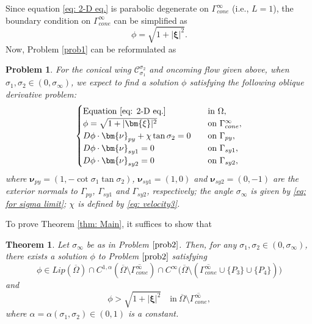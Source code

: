 \documentclass[reqno,12pt]{amsart}
\newtheorem{theorem}{Theorem}[section]
\newtheorem{problem}{Problem}[section]
\numberwithin{equation}{section}
\begin{document}
Since equation \eqref{eq: 2-D eq.} is parabolic degenerate on $\Gamma_{cone}^{\infty}$ (i.e., $L=1$), the boundary condition on $\Gamma_{cone}^{\infty}$ can be simplified as
\begin{equation}\label{eq:3.1}
	\phi=\sqrt{1+|\bm{\xi}|^{2}}.
\end{equation}
Now, Problem \ref{prob1} can be reformulated as

\begin{problem}\label{prob2}
    For the conical wing $\mathcal{C}_{\sigma_1}^{\sigma_2}$ and oncoming flow given above, when $\sigma_{1},\sigma_{2}\in(0,\sigma_{\infty})$, we expect to find a solution $\phi$ satisfying the following oblique derivative problem:
	\begin{equation}\label{eq: problem for phi}
		\begin{cases}
			\text{Equation}~\eqref{eq: 2-D eq.}\quad&\text{in $\Omega$},\\
			\phi=\sqrt{1+|\bm{\xi}|^{2}}\quad&\text{on $\Gamma_{cone}^{\infty}$},\\
			D\phi\cdot\bm{\nu}_{py}+\chi\tan\sigma_2=0\quad&\text{on $\Gamma_{py}$},\\
			D\phi\cdot\bm{\nu}_{sy1}=0\quad&\text{on $\Gamma_{sy1}$},\\
                D\phi\cdot\bm{\nu}_{sy2}=0\quad&\text{on $\Gamma_{sy2}$},
		\end{cases}
	\end{equation}
    where $\bm{\nu}_{py}=(1,-\cot\sigma_1\tan\sigma_2)$, $\bm{\nu}_{sy1}=(1,0)$ and $\bm{\nu}_{sy2}=(0,-1)$ are the exterior normals to $\Gamma_{py}$, $\Gamma_{sy1}$ and $\Gamma_{sy2}$, respectively; the angle $\sigma_{\infty}$ is given by \eqref{eq: for sigma limit}; $\chi$ is defined by \eqref{eq: velocity3}.
\end{problem}

To prove Theorem \ref{thm: Main}, it suffices to show that

\begin{theorem}\label{thm4}
	Let $\sigma_{\infty}$ be as in Problem $\ref{prob2}$. Then, for any $\sigma_{1},\sigma_{2}\in(0,\sigma_{\infty})$, there exists a solution $\phi$ to Problem $\ref{prob2}$ satisfying
	\begin{equation*}
		\phi\in Lip(\overline{\Omega})\cap C^{1,\alpha}(\overline{\Omega}\setminus\overline{\Gamma_{cone}^{\infty}})\cap C^\infty\big(\overline{\Omega}\setminus(\overline{\Gamma_{cone}^{\infty}}\cup\{P_3\}\cup\{P_4\})\big)
	\end{equation*}
	and
	\begin{equation*}
		\phi >\sqrt{1+|\bm{\xi}|^{2}} \quad\text{in}~ \overline{\Omega}\setminus\overline{\Gamma_{cone}^{\infty}},
	\end{equation*}
    where $\alpha=\alpha(\sigma_1,\sigma_2)\in (0,1)$ is a constant.
\end{theorem}
\end{document}
